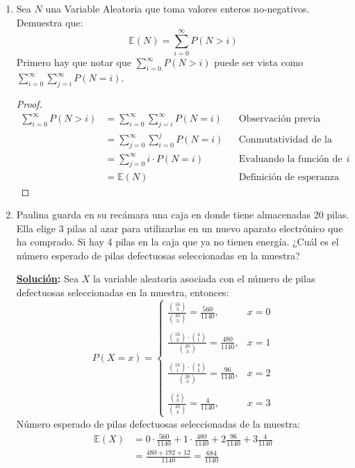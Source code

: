 \documentclass[11pt,letterpaper]{report}
\newcommand{\sol}{\textbf{\underline{Solución}: }} %
\begin{document}
\begin{enumerate}
\item Sea $N$ una Variable Aleatoria que toma valores enteros no-negativos. Demuestra que:
\[
    \mathds{E}(N) = \sum_{i=0}^{\infty} P(N > i)
\]
Primero hay que notar que $\sum_{i=0}^{\infty} P(N > i)$ puede ser vista como
$\sum_{i=0}^{\infty} \sum_{j=i}^{\infty} P(N = i)$.
\begin{proof}
    \begin{align*}
        \sum_{i=0}^{\infty} P(N > i)
            &= \sum_{i=0}^{\infty} \sum_{j=i}^{\infty} P(N = i) && \text{Observación previa}\\
            &= \sum_{j=0}^{\infty} \sum_{i=0}^{j} P(N = i) && \text{Conmutatividad de la suma}\\
            &= \sum_{j=0}^{\infty} i \cdot P(N = i) && \text{Evaluando la función de probabilidad en $i$}\\
            &= \mathds{E}(N) && \text{Definición de esperanza}
    \end{align*}
\end{proof}

\item Paulina guarda en su recámara una caja en donde tiene almacenadas 20 pilas. Ella elige 3 pilas
al azar para utilizarlas en un nuevo aparato electrónico que ha comprado. Si hay 4 pilas en la caja
que ya no tienen energía. ¿Cuál es el número esperado de pilas defectuosas seleccionadas en la muestra?

\sol Sea $X$ la variable aleatoria asociada con el número de pilas defectuosas seleccionadas en
la muestra, entonces:
\[
    P(X=x) =
        \begin{cases}
            \frac{\binom{16}{3}}{\binom{20}{3}} =
                \frac{560}{1140}, & x=0\\\\
            \frac{\binom{16}{2} \cdot \binom{4}{1}}{\binom{20}{3}} =
                \frac{480}{1140}, & x=1\\\\
            \frac{\binom{16}{1} \cdot \binom{4}{2}}{\binom{20}{3}} =
                \frac{96}{1140}, & x=2\\\\
            \frac{\binom{4}{3}}{\binom{20}{3}} =
                \frac{4}{1140}, & x=3
        \end{cases}
\]
Número esperado de pilas defectuosas seleccionadas de la muestra:
\begin{align*}
    \mathds{E}(X)
        &= 0 \cdot \frac{560}{1140} + 1 \cdot \frac{480}{1140} + 2 \frac{96}{1140} + 3 \frac{4}{1140}\\
        &= \frac{480+192+12}{1140} = \frac{684}{1140}
\end{align*}


\end{enumerate}
\end{document}
